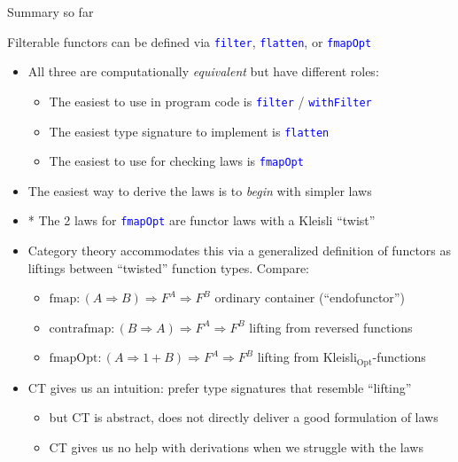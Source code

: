 \documentclass[english]{beamer}
\begin{document}
\begin{frame}{Summary so far}

Filterable functors can be defined via \texttt{\textcolor{blue}{\footnotesize{}filter}},
\texttt{\textcolor{blue}{\footnotesize{}flatten}}, or \texttt{\textcolor{blue}{\footnotesize{}fmapOpt}} 
\begin{itemize}
\item All three are computationally \emph{equivalent} but have different
roles:
\begin{itemize}
\item The easiest to use in program code is \texttt{\textcolor{blue}{\footnotesize{}filter}}
/ \texttt{\textcolor{blue}{\footnotesize{}withFilter}} 
\item The easiest type signature to implement is \texttt{\textcolor{blue}{\footnotesize{}flatten}} 
\item The easiest to use for checking laws is \texttt{\textcolor{blue}{\footnotesize{}fmapOpt}} 
\end{itemize}
\item The easiest way to derive the laws is to \emph{begin} with simpler
laws
\item {*} The 2 laws for \texttt{\textcolor{blue}{\footnotesize{}fmapOpt}}
are functor laws with a Kleisli ``twist''
\item Category theory accommodates this via a generalized definition of
functors as liftings between ``twisted'' function types. Compare:
\begin{itemize}
\item $\text{fmap}:\left(A\Rightarrow B\right)\Rightarrow F^{A}\Rightarrow F^{B}$
\textendash{} ordinary container (``endofunctor'')
\item $\text{contrafmap}:\left(B\Rightarrow A\right)\Rightarrow F^{A}\Rightarrow F^{B}$
\textendash{} lifting from reversed functions
\item $\text{fmapOpt}:\left(A\Rightarrow1+B\right)\Rightarrow F^{A}\Rightarrow F^{B}$
\textendash{} lifting from Kleisli$_{\text{Opt}}$-functions 
\end{itemize}
\item CT gives us an intuition: prefer type signatures that resemble ``lifting''
\begin{itemize}
\item but CT is abstract, does not directly deliver a good formulation of
laws
\item CT gives us no help with derivations when we struggle with the laws
\end{itemize}
\end{itemize}
\end{frame}
\end{document}
